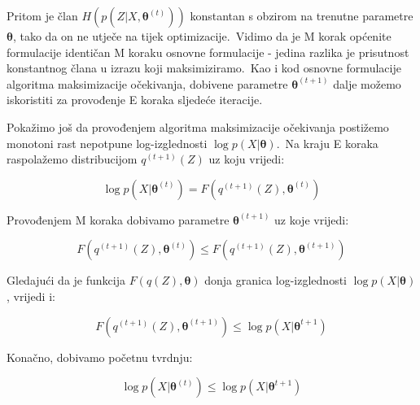 \documentclass[diplomskirad]{fer}
\begin{document}
Pritom je član $H(p(Z | X, \bm{\theta}^{(t)}))$ konstantan s obzirom na trenutne parametre $\bm{\theta}$, tako da on ne utječe na tijek optimizacije.\
Vidimo da je M korak općenite formulacije identičan M koraku osnovne formulacije - jedina razlika je prisutnost konstantnog člana u izrazu koji maksimiziramo.\ 
Kao i kod osnovne formulacije algoritma maksimizacije očekivanja, dobivene parametre $\bm{\theta}^{(t + 1)}$ dalje možemo iskoristiti za provođenje E koraka sljedeće iteracije.\ 


Pokažimo još da provođenjem algoritma maksimizacije očekivanja postižemo monotoni rast nepotpune log-izglednosti $\log p(X | \bm{\theta})$.\ 
Na kraju E koraka raspolažemo distribucijom $q^{(t + 1)}(Z)$ uz koju vrijedi:

\begin{equation}
  \log p(X | \bm{\theta}^{(t)}) = F(q^{(t + 1)}(Z), \bm{\theta}^{(t)})
  \label{eq:em_proof_pt1}
\end{equation}

Provođenjem M koraka dobivamo parametre $\bm{\theta}^{(t + 1)}$ uz koje vrijedi:

\begin{equation}
  F(q^{(t + 1)}(Z), \bm{\theta}^{(t)}) \leq F(q^{(t + 1)}(Z), \bm{\theta}^{(t + 1)})
  \label{eq:em_proof_pt2}
\end{equation}

Gledajući da je funkcija $F(q(Z), \bm{\theta})$ donja granica log-izglednosti $\log p(X | \bm{\theta})$, vrijedi i:

\begin{equation}
  F(q^{(t + 1)}(Z), \bm{\theta}^{(t + 1)}) \leq \log p(X | \bm{\theta}^{t + 1})
  \label{eq:em_proof_pt3}
\end{equation}

Konačno, dobivamo početnu tvrdnju:

\begin{equation}
  \log p(X | \bm{\theta}^{(t)}) \leq \log p(X | \bm{\theta}^{t + 1})
  \label{eq:em_proof_final}
\end{equation}
\end{document}
